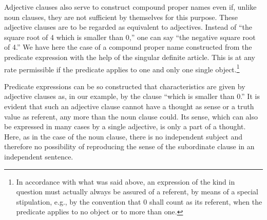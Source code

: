 \documentclass[twoside,12pt,a4paper]{article}
\begin{document}
Adjective clauses also serve to construct compound proper names even
if, unlike noun clauses, they are not sufficient by themselves for
this purpose. These adjective clauses are to be regarded as equivalent
to adjectives. Instead of ``the square root of 4 which is smaller than
0,'' one can say ``the negative square root of 4.'' We have here the
case of a compound proper name constructed from the predicate
expression with the help of the singular definite article. This is at
any rate permissible if the predicate applies to one and only one
single object.\footnote[9]{In accordance with what was said above, an
  expression of the kind in question must actually always be assured
  of a referent, by means of a special stipulation, e.g., by the
  convention that 0 shall count as its referent, when the predicate
  applies to no object or to more than one.}

Predicate expressions can be so constructed that characteristics are
given by adjective clauses as, in our example, by the clause ``which
is smaller than 0.'' It is evident that such an adjective clause
cannot have a thought as sense or a truth value as referent, any more
than the noun clause could. Its sense, which can also be expressed in
many cases by a single adjective, is only a part of a thought. Here,
as in the case of the noun clause, there is no independent subject and
therefore no possibility of reproducing the sense of the subordinate
clause in an independent sentence.
\end{document}
